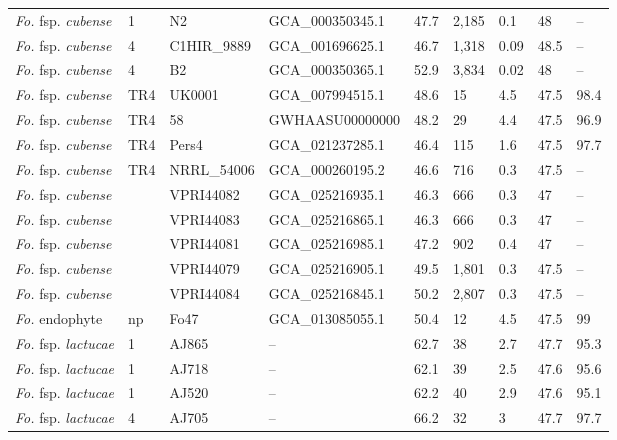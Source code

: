\begin{ThreePartTable}
\begin{longtable}[c]{@{}C{2.5cm}C{0.8cm}C{2cm}C{2.8cm}C{1cm}C{1cm}C{1.5cm}C{0.7cm}C{2.5cm}@{}}
\textit{Fo.} fsp. \textit{cubense}      & 1   & N2           & GCA\_000350345.1 & 47.7 & 2,185 & 0.1  & 48   &--    \\
\textit{Fo.} fsp. \textit{cubense}      & 4   & C1HIR\_9889  & GCA\_001696625.1 & 46.7 & 1,318 & 0.09 & 48.5 &--    \\
\textit{Fo.} fsp. \textit{cubense}      & 4   & B2           & GCA\_000350365.1 & 52.9 & 3,834 & 0.02 & 48   &--    \\
\textit{Fo.} fsp. \textit{cubense}      & TR4 & UK0001       & GCA\_007994515.1 & 48.6 & 15    & 4.5  & 47.5 & 98.4 \\
\textit{Fo.} fsp. \textit{cubense}      & TR4 & 58           & GWHAASU00000000  & 48.2 & 29    & 4.4  & 47.5 & 96.9 \\
\textit{Fo.} fsp. \textit{cubense}      & TR4 & Pers4        & GCA\_021237285.1 & 46.4 & 115   & 1.6  & 47.5 & 97.7 \\
\textit{Fo.} fsp. \textit{cubense}      & TR4 & NRRL\_54006   & GCA\_000260195.2 & 46.6 & 716   & 0.3  & 47.5 &--    \\
\textit{Fo.} fsp. \textit{cubense}      &     & VPRI44082    & GCA\_025216935.1 & 46.3 & 666   & 0.3  & 47   &--    \\
\textit{Fo.} fsp. \textit{cubense}      &     & VPRI44083    & GCA\_025216865.1 & 46.3 & 666   & 0.3  & 47   &--    \\
\textit{Fo.} fsp. \textit{cubense}      &     & VPRI44081    & GCA\_025216985.1 & 47.2 & 902   & 0.4  & 47   &--    \\
\textit{Fo.} fsp. \textit{cubense}      &     & VPRI44079    & GCA\_025216905.1 & 49.5 & 1,801  & 0.3  & 47.5 &--    \\
\textit{Fo.} fsp. \textit{cubense}      &     & VPRI44084    & GCA\_025216845.1 & 50.2 & 2,807 & 0.3  & 47.5 &--    \\
\textit{Fo.} endophyte         & np  & Fo47         & GCA\_013085055.1 & 50.4 & 12    & 4.5  & 47.5 & 99   \\
\textit{Fo.} fsp. \textit{lactucae}     & 1   & AJ865        &--             & 62.7 & 38    & 2.7  & 47.7 & 95.3 \\
\textit{Fo.} fsp. \textit{lactucae}     & 1   & AJ718        &--             & 62.1 & 39    & 2.5  & 47.6 & 95.6 \\
\textit{Fo.} fsp. \textit{lactucae}     & 1   & AJ520        &--             & 62.2 & 40    & 2.9  & 47.6 & 95.1 \\
\textit{Fo.} fsp. \textit{lactucae}     & 4   & AJ705        &--             & 66.2 & 32    & 3    & 47.7 & 97.7 \\

\end{longtable}
\end{ThreePartTable}
